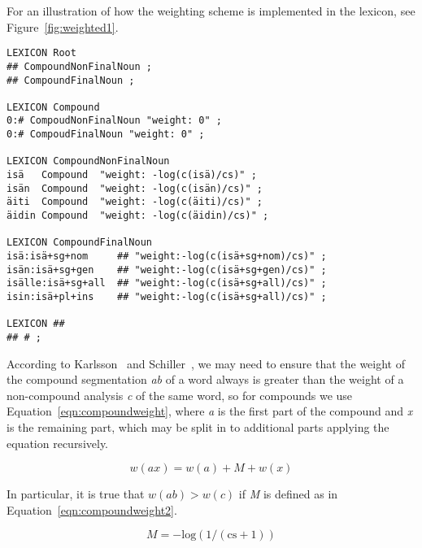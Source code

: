 \documentclass[postprint]{flammie}
\begin{document}
For an illustration of how the weighting scheme is implemented in the
lexicon, see Figure~\ref{fig:weighted1}.

\begin{figure*}[htb!]
\begin{small}
\begin{verbatim}
LEXICON Root
## CompoundNonFinalNoun ;
## CompoundFinalNoun ;

LEXICON Compound
0:# CompoudNonFinalNoun "weight: 0" ;
0:# CompoudFinalNoun "weight: 0" ;

LEXICON CompoundNonFinalNoun
isä   Compound  "weight: -log(c(isä)/cs)" ;
isän  Compound  "weight: -log(c(isän)/cs)" ;
äiti  Compound  "weight: -log(c(äiti)/cs)" ;
äidin Compound  "weight: -log(c(äidin)/cs)" ;

LEXICON CompoundFinalNoun
isä:isä+sg+nom     ## "weight:-log(c(isä+sg+nom)/cs)" ;
isän:isä+sg+gen    ## "weight:-log(c(isä+sg+gen)/cs)" ;
isälle:isä+sg+all  ## "weight:-log(c(isä+sg+all)/cs)" ;
isin:isä+pl+ins    ## "weight:-log(c(isä+sg+all)/cs)" ;

LEXICON ##
## # ;
\end{verbatim}
\caption{Structure weighting scheme using token penalties.
}\label{fig:weighted1}
\end{small}
\end{figure*}

According to Karlsson~\cite{karlsson/1992} and
Schiller~\cite{schiller/2005}, we may need to ensure that the
weight of the compound segmentation \emph{ab} of a word always is
greater than the weight of a non-compound analysis \emph{c} of the
same word, so for compounds we use Equation~\ref{eqn:compoundweight},
where \emph{a} is the first part of the compound and \emph{x} is the
remaining part, which may be split in to additional parts applying the
equation recursively.

\begin{small}
  \begin{equation}
    \label{eqn:compoundweight}
    w(ax) = w(a) + M + w(x)
  \end{equation}
\end{small}

In particular, it is true that $w(ab) > w(c)$ if \emph{M} is
defined as in Equation~\ref{eqn:compoundweight2}.

\begin{small}
  \begin{equation}
    \label{eqn:compoundweight2}
    M = -\mathrm{log}(1/(\mathrm{cs}+1))
  \end{equation}
\end{small}
\end{document}
